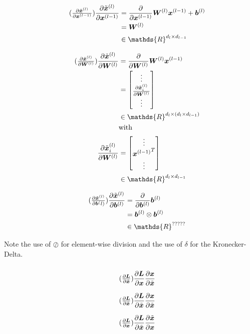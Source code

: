 \documentclass{article}
\newcommand\bM[1]{\ensuremath{\begin{bmatrix}#1\end{bmatrix}}}
\newcommand\·{\ensuremath{\cdot}}
\newcommand\…{\ensuremath{\ldots}}
\renewcommand\t{\ensuremath{\times}}
\newcommand\pf[2]{\ensuremath{\frac{\partial {#1}}{\partial {#2}}}}
\newcommand*{\B}[1]{\ifmmode\bm{#1}\else\textbf{#1}\fi}
\newcommand\1{\ensuremath{\mathds{1}}}
\newcommand\R{\ensuremath{\mathds{R}}}
\begin{document}
\begin{align*}
  \tag{$\pf{\tilde{\B{x}}^{(l)}}{\B{x}^{(l-1)}}$}
  \pf{\tilde{\B{x}}^{(l)}}{\B{x}^{(l-1)}}
  &= \pf{}{\B{x}^{(l-1)}} \B{W}^{(l)}\B{x}^{(l-1)} + \B{b}^{(l)}\\
  &=\B{W}^{(l)}\\
  &\in\R^{d_l\t d_{l-1}}
\end{align*}

\begin{align*}
  \tag{$\pf{\tilde{\B{x}}^{(l)}}{\B{W}^{(l)}}$}
  \pf{\tilde{\B{x}}^{(l)}}{\B{W}^{(l)}}
  &= \pf{}{\B{W}^{(l)}}\B{W}^{(l)}\B{x}^{(l-1)}\\
  &= \bM{\vdots\\\pf{\tilde{\B{x}}^{(l)}_i}{\B{W}^{(l)}}\\\vdots}\\
  &\in\R^{d_l\t (d_l\t d_{l-1})}\\
  &\text{with}\\
  \pf{\tilde{\B{x}}^{(l)}_i}{\B{W}^{(l)}}
  &= \bM{\vdots\\{\B{x}^{(l-1)}}^T\\\vdots}\\
  &\in\R^{d_l\t d_{l-1}}
\end{align*}

\begin{align*}
  \tag{$\pf{\tilde{\B{x}}^{(l)}}{\B{b}^(l)}$}
  \pf{\tilde{\B{x}}^{(l)}}{\B{b}^{(l)}}
  &= \pf{}{\B{b}^{(l)}}\B{b}^{(l)}\\
  &= \B{b}^{(l)} \otimes \B{b}^{(l)}\\
  &\in\R^{?????}
\end{align*}

Note the use of $\oslash$ for element-wise division and the use of $\delta$ for the Kronecker-Delta.

\subsubsection{}
\begin{align*}
  \tag{$\pf{\B{L}}{\tilde{\B{x}}}$}
  \pf{\B{L}}{\B{x}}\pf{\B{x}}{\tilde{\B{x}}}\\
\end{align*}

\begin{align*}
  \tag{$\pf{\B{L}}{\tilde{\B{x}}}$}
  \pf{\B{L}}{\tilde{\B{x}}}\pf{\B{x}}{\tilde{\B{x}}}\\
\end{align*}

\begin{align*}
  \tag{$\pf{\B{L}}{\B{x}}$}
  \pf{\B{L}}{\tilde{\B{x}}}\pf{\tilde{\B{x}}}{\B{x}}\\
\end{align*}
\end{document}
